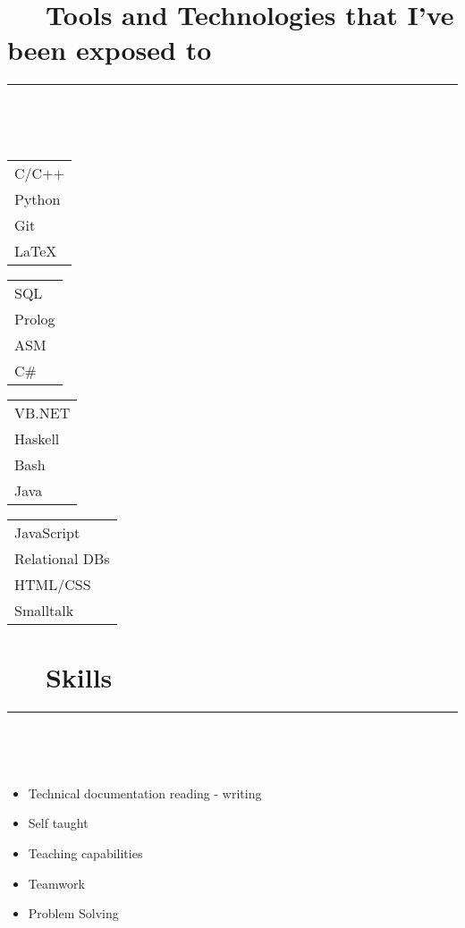 \documentclass{article}
\begin{document}
\section*{\faCogs ~~ Tools and Technologies that I've been exposed to} 
\hrule
\

\
    
\begin{multicols}{4}
    \begin{tabular}{l}
        C/C++ \\
        Python \\
        Git \\
        LaTeX
    \end{tabular}

    \begin{tabular}{l}
        SQL \\
        Prolog \\
        ASM \\
        C\#
    \end{tabular}
    
    \begin{tabular}{l}
        VB.NET \\
        Haskell \\
        Bash \\
        Java
    \end{tabular}
    
    \begin{tabular}{l}
        JavaScript \\
        Relational DBs \\
        HTML/CSS \\
        Smalltalk
    \end{tabular}
   
\end{multicols}

\newpage

\section*{\faCoffee ~~ Skills} 
\hrule
\

\

\begin{multicols}{2}
    \begin{itemize}
        \item Technical documentation reading - writing
        \item Self taught
        \item Teaching capabilities
        \item Teamwork
        \item Problem Solving
    \end{itemize}
\end{multicols}
\end{document}
